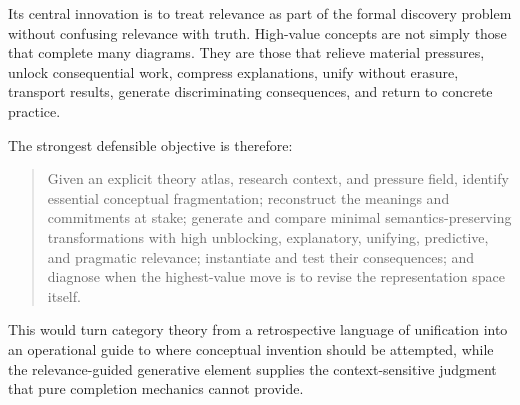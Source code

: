 \documentclass[11pt]{article}
\begin{document}
Its central innovation is to treat relevance as part of the formal discovery problem without confusing
relevance with truth. High-value concepts are not simply those that complete many diagrams. They are
those that relieve material pressures, unlock consequential work, compress explanations, unify without
erasure, transport results, generate discriminating consequences, and return to concrete practice.

The strongest defensible objective is therefore:

\begin{quote}
Given an explicit theory atlas, research context, and pressure field, identify essential conceptual
fragmentation; reconstruct the meanings and commitments at stake; generate and compare minimal
semantics-preserving transformations with high unblocking, explanatory, unifying, predictive, and
pragmatic relevance; instantiate and test their consequences; and diagnose when the highest-value move
is to revise the representation space itself.
\end{quote}

This would turn category theory from a retrospective language of unification into an operational guide
to where conceptual invention should be attempted, while the relevance-guided generative element
supplies the context-sensitive judgment that pure completion mechanics cannot provide.
\end{document}
